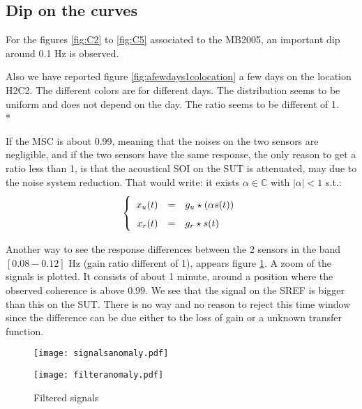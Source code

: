 \newpage\clearpage
\subsection{Dip on the curves}
For the figures \ref{fig:C2} to \ref{fig:C5} associated to the MB2005, an important dip around 0.1 Hz is observed. 

Also we have reported figure \ref{fig:afewdays1colocation} a few days on the location H2C2. The different colors are for different days. The distribution seems to be uniform and does not depend on the day. The ratio seems to be different of 1.\\*

If the MSC is about 0.99, meaning that the noises on the two sensors are negligible, and if the two sensors have the same response, the only reason to get a ratio less than 1, is that the acoustical SOI on the SUT is attenuated, may due to the noise system reduction. That would write: it exists $\alpha\in\mathbb{C}$ with $|\alpha|<1$ s.t.:
\begin{eqnarray}
\label{eq:model-of-obervation}
\left\{
\renewcommand\arraystretch{1.6}
\begin{array}{rcl}
x_{\ut}(t)&=&g_{\ut}  \star (\alpha s(t))
\\
x_{\rf}(t)&=&g_{\rf}  \star s(t)
\end{array}
\right.
\end{eqnarray}



Another way to see the response differences between the 2 sensors in the band  $[0.08-0.12]$ Hz (gain ratio different of 1), appears figure \ref{fig:filteredsignals}. A zoom of the signals is plotted. It consists of about 1 minute, around a position where the observed coherence is above $0.99$. We see that the signal on the SREF  is bigger than this on the SUT. There is no way and no reason to reject this time window since the difference can be due either to the loss of gain or a unknown transfer function. 
\begin{figure}%
\begin{minipage}{10cm}
              \texttt{[image: signalsanomaly.pdf]}
\end{minipage}
\begin{minipage}[c]{8cm}
              \texttt{[image: filteranomaly.pdf]}    

\end{minipage}
\centering
\caption{Filtered signals}
\label{fig:filteredsignals}
\end{figure}

